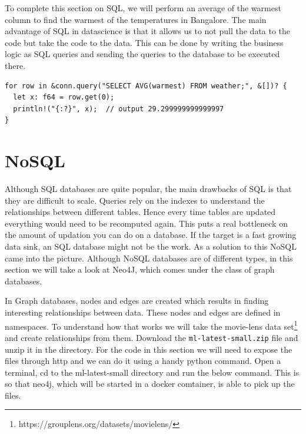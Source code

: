 \documentclass{book}
\begin{document}
To complete this section on SQL, we will perform an average of the warmest column to find the warmest of the temperatures in Bangalore. The main advantage of SQL in datascience is that it allows us to not pull the data to the code but take the code to the data. This can be done by writing the business logic as SQL queries and sending the queries to the database to be executed there.

\begin{lstlisting}[caption={chapter4\\/working\_with\_data\\/databases\\/src\\/main\\.rs},basicstyle=\small]
for row in &conn.query("SELECT AVG(warmest) FROM weather;", &[])? {
  let x: f64 = row.get(0);
  println!("{:?}", x);  // output 29.299999999999997
}
\end{lstlisting}
\label{sec:sql}

\section{NoSQL}%
Although SQL databases are quite popular, the main drawbacks of SQL is that they are difficult to scale. Queries rely on the indexes to understand the relationships between different tables. Hence every time tables are updated everything would need to be recomputed again. This puts a real bottleneck on the amount of updation you can do on a database. If the target is a fast growing data sink, an SQL database might not be the work. As a solution to this NoSQL came into the picture. Although NoSQL databases are of different types, in this section we will take a look at Neo4J, which comes under the class of graph databases.

In Graph databases, nodes and edges are created which results in finding interesting relationships between data. These nodes and edges are defined in namespaces. To understand how that works we will take the movie-lens data set\footnote{https://grouplens.org/datasets/movielens/} and create relationships from them. Download the \lstinline{ml-latest-small.zip} file and unzip it in the directory. For the code in this section we will need to expose the files through http and we can do it using a handy python command. Open a terminal, cd to the ml-latest-small directory and run the below command. This is so that neo4j, which will be started in a docker comtainer, is able to pick up the files.
\end{document}
